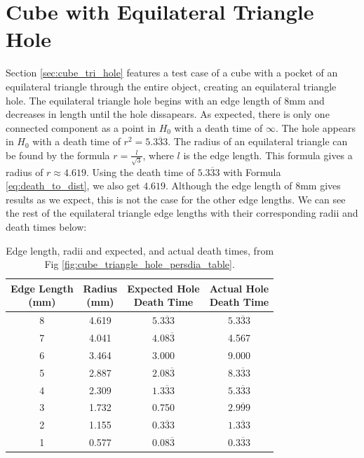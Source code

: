 \documentclass[ma]{uncgdissertationexp}
\theoremstyle{plain}
\theoremstyle{definition}
\theoremstyle{remark}
\begin{document}
\section{Cube with Equilateral Triangle Hole}
\par Section \ref{sec:cube_tri_hole} features a test case of a cube with a pocket of an equilateral triangle through the entire object, creating an equilateral triangle hole. The equilateral triangle hole begins with an edge length of 8mm and decreases in length until the hole dissapears. As expected, there is only one connected component as a point in $H_{0}$ with a death time of $\infty$. The hole appears in $H_{0}$ with a death time of $r^{2} = 5.\overline{333}$. The radius of an equilateral triangle can be found by the formula $r = \frac{l}{\sqrt{3}}$, where $l$ is the edge length. This formula gives a radius of $r\approx 4.619$. Using the death time of $5.\overline{333}$ with Formula \ref{eq:death_to_dist}, we also get $4.619$. Although the edge length of 8mm gives results as we expect, this is not the case for the other edge lengths. We can see the rest of the equilateral triangle edge lengths with their corresponding radii and death times below:
\begin{table}[H]
\centering
\begin{tabular}{|c|c|c|c|}
    \hline
    \makecell{Edge Length\\(mm)} & \makecell{Radius\\(mm)} & \makecell{Expected Hole\\Death Time} & \makecell{Actual Hole\\ Death Time}\\
    \hline
    8     & 4.619 & $5.\overline{333}$ & $5.\overline{333}$\\
    7     & 4.041 & $4.08\overline{3}$ & 4.567 \\
    6     & 3.464 & 3.000 & 9.000\\
    5     & 2.887 & $2.08\overline{3}$ & $8.\overline{333}$\\
    4     & 2.309  & $1.\overline{333}$ & $5.\overline{333}$\\
    3     & 1.732 & 0.750 & $2.\overline{999}$\\
    2     & 1.155 & $0.\overline{333}$ & $1.\overline{333}$\\
    1     & 0.577 & $0.08\overline{3}$ & $0.\overline{333}$\\
    \hline
\end{tabular}
\caption{Edge length, radii and expected, and actual death times, from Fig \ref{fig:cube_triangle_hole_persdia_table}.}
\label{tab:eq_tri_hole_table}
\end{table}
\end{document}
